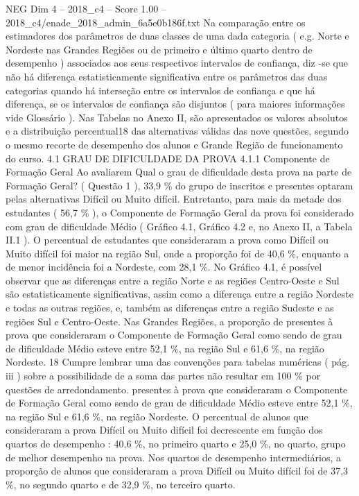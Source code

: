 \begin{textsample}{NEG Dim 4 – 2018\_c4 – Score 1.00 – 2018\_c4/enade\_2018\_admin\_6a5e0b186f.txt}
Na comparação entre os estimadores dos parâmetros de duas classes de uma dada categoria ( e.g.
Norte e Nordeste nas Grandes Regiões ou de primeiro e último quarto dentro de desempenho ) associados aos seus respectivos intervalos de confiança, diz -se que não há diferença estatisticamente significativa entre os parâmetros das duas categorias quando há interseção entre os intervalos de confiança e que há diferença, se os intervalos de confiança são disjuntos ( para maiores informações vide Glossário ).
Nas Tabelas no Anexo II, são apresentados os valores absolutos e a distribuição percentual18 das alternativas válidas das nove questões, segundo o mesmo recorte de desempenho dos alunos e Grande Região de funcionamento do curso. 4.1 GRAU DE DIFICULDADE DA PROVA 4.1.1 Componente de Formação Geral Ao avaliarem Qual o grau de dificuldade desta prova na parte de Formação Geral? ( Questão 1 ), 33,9 \% do grupo de inscritos e presentes optaram pelas alternativas Difícil ou Muito difícil.
Entretanto, para mais da metade dos estudantes ( 56,7 \% ), o Componente de Formação Geral da prova foi considerado com grau de dificuldade Médio ( Gráfico 4.1, Gráfico 4.2 e, no Anexo II, a Tabela II.1 ).
O percentual de estudantes que consideraram a prova como Difícil ou Muito difícil foi maior na região Sul, onde a proporção foi de 40,6 \%, enquanto a de menor incidência foi a Nordeste, com 28,1 \%.
No Gráfico 4.1, é possível observar que as diferenças entre a região Norte e as regiões Centro-Oeste e Sul são estatisticamente significativas, assim como a diferença entre a região Nordeste e todas as outras regiões, e, também as diferenças entre a região Sudeste e as regiões Sul e Centro-Oeste.
Nas Grandes Regiões, a proporção de presentes à prova que consideraram o Componente de Formação Geral como sendo de grau de dificuldade Médio esteve entre 52,1 \%, na região Sul e 61,6 \%, na região Nordeste. 18 Cumpre lembrar uma das convenções para tabelas numéricas ( pág. iii ) sobre a possibilidade de a soma das partes não resultar em 100 \% por questões de arredondamento. presentes à prova que consideraram o Componente de Formação Geral como sendo de grau de dificuldade Médio esteve entre 52,1 \%, na região Sul e 61,6 \%, na região Nordeste.
O percentual de alunos que consideraram a prova Difícil ou Muito difícil foi decrescente em função dos quartos de desempenho : 40,6 \%, no primeiro quarto e 25,0 \%, no quarto, grupo de melhor desempenho na prova.
Nos quartos de desempenho intermediários, a proporção de alunos que consideraram a prova Difícil ou Muito difícil foi de 37,3 \%, no segundo quarto e de 32,9 \%, no terceiro quarto.

\end{textsample}
